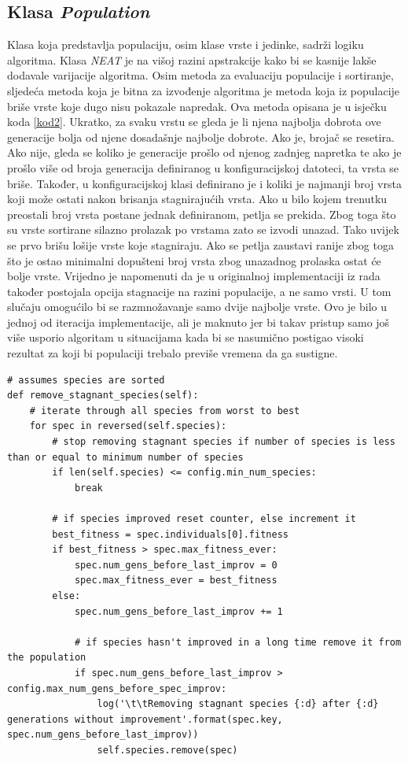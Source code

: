 \documentclass[times, utf8, diplomski, numeric]{fer}
\begin{document}
\subsection{Klasa \textit{Population}}
Klasa koja predstavlja populaciju, osim klase vrste i jedinke, sadrži logiku algoritma. Klasa \textit{NEAT} je na višoj razini apstrakcije kako bi se kasnije lakše dodavale varijacije algoritma. Osim metoda za evaluaciju populacije i sortiranje, sljedeća metoda koja je bitna za izvođenje algoritma je metoda koja iz populacije briše vrste koje dugo nisu pokazale napredak. Ova metoda opisana je u isječku koda \ref{kod2}. Ukratko, za svaku vrstu se gleda je li njena najbolja dobrota ove generacije bolja od njene dosadašnje najbolje dobrote. Ako je, brojač se resetira. Ako nije, gleda se koliko je generacije prošlo od njenog zadnjeg napretka te ako je prošlo više od broja generacija definiranog u konfiguracijskoj datoteci, ta vrsta se briše. Također, u konfiguracijskoj klasi definirano je i koliki je najmanji broj vrsta koji može ostati nakon brisanja stagnirajućih vrsta. Ako u bilo kojem trenutku preostali broj vrsta postane jednak definiranom, petlja se prekida. Zbog toga što su vrste sortirane silazno prolazak po vrstama zato se izvodi unazad. Tako uvijek se prvo brišu lošije vrste koje stagniraju. Ako se petlja zaustavi ranije zbog toga što je ostao minimalni dopušteni broj vrsta zbog unazadnog prolaska ostat će bolje vrste. Vrijedno je napomenuti da je u originalnoj implementaciji iz rada \citep{rad5} također postojala opcija stagnacije na razini populacije, a ne samo vrsti. U tom slučaju omogućilo bi se razmnožavanje samo dvije najbolje vrste. Ovo je bilo u jednoj od iteracija implementacije, ali je maknuto jer bi takav pristup samo još više usporio algoritam u situacijama kada bi se nasumično postigao visoki rezultat za koji bi populaciji trebalo previše vremena da ga sustigne.

\begin{lstlisting}[frame=single, label=kod2, caption=Izvorni tekst metode \textit{remove\_stagnant\_species} u klasi \textit{Population}]
# assumes species are sorted
def remove_stagnant_species(self):
	# iterate through all species from worst to best
	for spec in reversed(self.species):
		# stop removing stagnant species if number of species is less than or equal to minimum number of species
		if len(self.species) <= config.min_num_species:
			break

		# if species improved reset counter, else increment it
		best_fitness = spec.individuals[0].fitness
		if best_fitness > spec.max_fitness_ever:
			spec.num_gens_before_last_improv = 0
			spec.max_fitness_ever = best_fitness
		else:
			spec.num_gens_before_last_improv += 1

			# if species hasn't improved in a long time remove it from the population
			if spec.num_gens_before_last_improv > config.max_num_gens_before_spec_improv:
				log('\t\tRemoving stagnant species {:d} after {:d} generations without improvement'.format(spec.key, spec.num_gens_before_last_improv))
				self.species.remove(spec)
\end{lstlisting}
\end{document}
